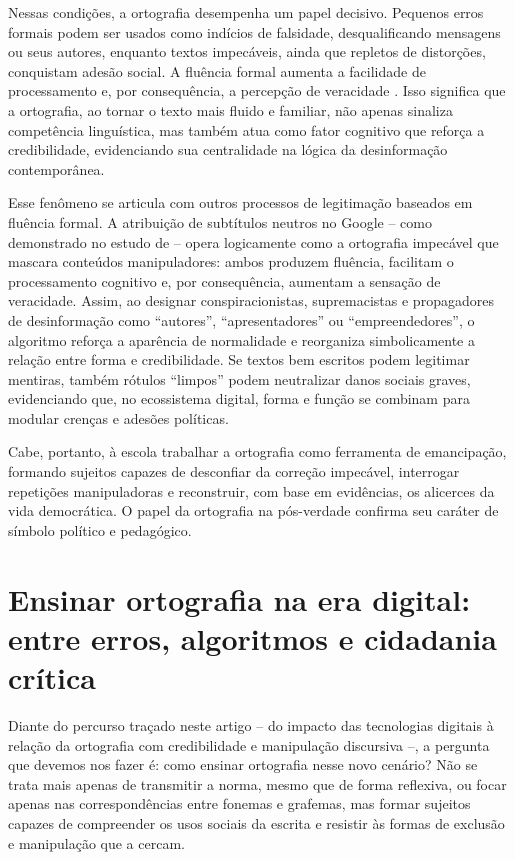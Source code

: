 \documentclass[portuguese]{textolivre}
\begin{document}
Nessas condições, a ortografia desempenha um papel decisivo. Pequenos erros formais podem ser usados como indícios de falsidade, desqualificando mensagens ou seus autores, enquanto textos impecáveis, ainda que repletos de distorções, conquistam adesão social. A fluência formal aumenta a facilidade de processamento e, por consequência, a percepção de veracidade \cite{fazio2015illusorytruth}. Isso significa que a ortografia, ao tornar o texto mais fluido e familiar, não apenas sinaliza competência linguística, mas também atua como fator cognitivo que reforça a credibilidade, evidenciando sua centralidade na lógica da desinformação contemporânea.

Esse fenômeno se articula com outros processos de legitimação baseados em fluência formal. A atribuição de subtítulos neutros no Google – como demonstrado no estudo de \textcite{alrawi2022autocomplete} – opera logicamente como a ortografia impecável que mascara conteúdos manipuladores: ambos produzem fluência, facilitam o processamento cognitivo e, por consequência, aumentam a sensação de veracidade. Assim, ao designar conspiracionistas, supremacistas e propagadores de desinformação como “autores”, “apresentadores” ou “empreendedores”, o algoritmo reforça a aparência de normalidade e reorganiza simbolicamente a relação entre forma e credibilidade. Se textos bem escritos podem legitimar mentiras, também rótulos “limpos” podem neutralizar danos sociais graves, evidenciando que, no ecossistema digital, forma e função se combinam para modular crenças e adesões políticas.

Cabe, portanto, à escola trabalhar a ortografia como ferramenta de emancipação, formando sujeitos capazes de desconfiar da correção impecável, interrogar repetições manipuladoras e reconstruir, com base em evidências, os alicerces da vida democrática. O papel da ortografia na pós-verdade confirma seu caráter de símbolo político e pedagógico.


\section{Ensinar ortografia na era digital: entre erros, algoritmos e cidadania crítica}\label{sec-fmt-manuscrito}
Diante do percurso traçado neste artigo – do impacto das tecnologias digitais à relação da ortografia com credibilidade e manipulação discursiva –, a pergunta que devemos nos fazer é: como ensinar ortografia nesse novo cenário? Não se trata mais apenas de transmitir a norma, mesmo que de forma reflexiva, ou focar apenas nas correspondências entre fonemas e grafemas, mas formar sujeitos capazes de compreender os usos sociais da escrita e resistir às formas de exclusão e manipulação que a cercam.
\end{document}
